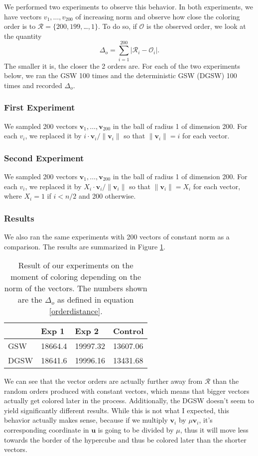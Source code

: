 \documentclass[12pt]{article}
\begin{document}
We performed two experiments to observe this behavior. In both experiments, we have vectors $v_1,\dots,v_{200}$ of increasing norm and observe how close the coloring order is to $\mathcal{R}=\{200,199,$\dots$,1\}$. To do so, if $\mathcal{O}$ is the observed order, we look at the quantity 
\begin{equation}
\Delta_{o}=\sum_{i=1}^{200}|\mathcal{R}_i-\mathcal{O}_i|.
\label{orderdistance}
\end{equation}
The smaller it is, the closer the 2 orders are. For each of the two experiments below, we ran the GSW 100 times and the deterministic GSW (DGSW) 100 times and recorded $\Delta_o$.

\subsubsection{First Experiment}
We sampled 200 vectors $\textbf{v}_1,\dots,\textbf{v}_{200}$ in the ball of radius 1 of dimension 200. For each $v_i$, we replaced it by $i\cdot \textbf{v}_i/\|\textbf{v}_i\|$ so that $\|\textbf{v}_i\|=i$ for each vector. 

\subsubsection{Second Experiment}
We sampled 200 vectors $\textbf{v}_1,\dots,\textbf{v}_{200}$ in the ball of radius 1 of dimension 200. For each $v_i$, we replaced it by $X_i\cdot \textbf{v}_i/\|\textbf{v}_i\|$ so that $\|\textbf{v}_i\|=X_i$ for each vector, where $X_i=1$ if $i<n/2$ and 200 otherwise.

\subsubsection{Results}
We also ran the same experiments with 200 vectors of constant norm as a comparison. The results are summarized in Figure \ref{norm_when_colored}.
\begin{center}
\begin{table}[h]
\begin{tabular}{l|lll}
     & Exp 1   & Exp 2    & Control  \\
\hline
GSW  & 18664.4 & 19997.32 & 13607.06 \\
DGSW & 18641.6 & 19996.16 & 13431.68
\end{tabular}
\caption{Result of our experiments on the moment of coloring depending on the norm of the vectors. The numbers shown are the $\Delta_o$ as defined in equation \ref{orderdistance}.}
\label{norm_when_colored}
\end{table}
\end{center}
We can see that the vector orders are actually further away from $\mathcal{R}$ than the random orders produced with constant vectors, which means that bigger vectors actually get colored later in the process. Additionally, the DGSW doesn't seem to yield significantly different results. While this is not what I expected, this behavior actually makes sense, because if we multiply $\textbf{v}_i$ by $\mu\textbf{v}_i$, it's corresponding coordinate in $\textbf{u}$ is going to be divided by $\mu$, thus it will move less towards the border of the hypercube and thus be colored later than the shorter vectors.
\end{document}
